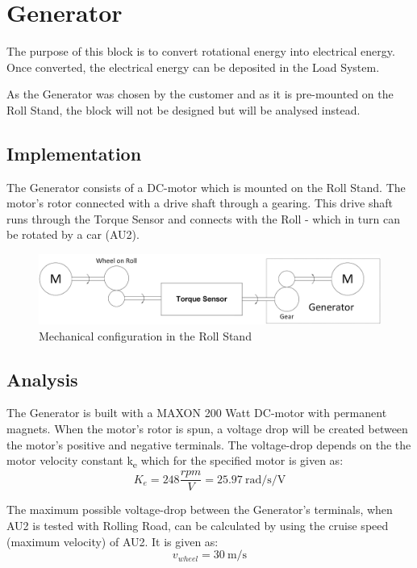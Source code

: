 \newpage
\section{Generator}
The purpose of this block is to convert rotational energy into electrical energy. Once converted, the electrical energy can be deposited in the Load System.

As the Generator was chosen by the customer and as it is pre-mounted on the Roll Stand, the block will not be designed but will be analysed instead.

\subsection{Implementation}
The Generator consists of a DC-motor which is mounted on the Roll Stand. The motor's rotor connected with a drive shaft through a gearing. This drive shaft runs through the Torque Sensor and connects with the Roll - which in turn can be rotated by a car (AU2).

\begin{figure}[H]
	\centering
	\includegraphics[width=1\linewidth]{Hardware/Pictures/Mechanical_Connections}
	\caption{Mechanical configuration in the Roll Stand}
	\label{fig:Generator_Implementation}
\end{figure}

\subsection{Analysis}
\label{sec:GeneratorAnalysis}
The Generator is built with a MAXON 200 Watt DC-motor with permanent magnets. When the motor's rotor is spun, a voltage drop will be created between the motor's positive and negative terminals. The voltage-drop depends on the the motor velocity constant k\textsubscript{e} which for the specified motor is given as:
\begin{equation}
	K_e = 248 \frac{rpm}{V} = \SI[per-mode=fraction]{25.97}{\radian \per \second \per \volt}
\end{equation}

The maximum possible voltage-drop between the Generator's terminals, when AU2 is tested with Rolling Road, can be calculated by using the cruise speed (maximum velocity) of AU2. It is given as:
\begin{equation}
	v_{wheel} = \SI[per-mode=fraction]{30}{\meter \per \second}
\end{equation}

